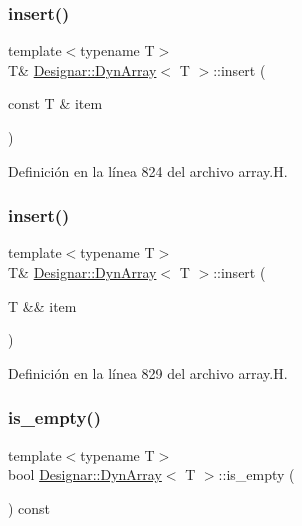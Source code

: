 \subsubsection{\texorpdfstring{insert()}{insert()}\hspace{0.1cm}{\footnotesize\ttfamily [3/4]}}
{\footnotesize\ttfamily template$<$typename T$>$ \\
T\& \hyperlink{class_designar_1_1_dyn_array}{Designar\+::\+Dyn\+Array}$<$ T $>$\+::insert (\begin{DoxyParamCaption}\item[{const T \&}]{item }\end{DoxyParamCaption})\hspace{0.3cm}{\ttfamily [inline]}}



Definición en la línea 824 del archivo array.\+H.

\mbox{\label{class_designar_1_1_dyn_array_a976a619d52dcc91d531e1b95609ec971}} 
\subsubsection{\texorpdfstring{insert()}{insert()}\hspace{0.1cm}{\footnotesize\ttfamily [4/4]}}
{\footnotesize\ttfamily template$<$typename T$>$ \\
T\& \hyperlink{class_designar_1_1_dyn_array}{Designar\+::\+Dyn\+Array}$<$ T $>$\+::insert (\begin{DoxyParamCaption}\item[{T \&\&}]{item }\end{DoxyParamCaption})\hspace{0.3cm}{\ttfamily [inline]}}



Definición en la línea 829 del archivo array.\+H.

\mbox{\label{class_designar_1_1_dyn_array_ae4692786599e9be77a9ca963b2fe7bf8}} 
\subsubsection{\texorpdfstring{is\+\_\+empty()}{is\_empty()}}
{\footnotesize\ttfamily template$<$typename T$>$ \\
bool \hyperlink{class_designar_1_1_dyn_array}{Designar\+::\+Dyn\+Array}$<$ T $>$\+::is\+\_\+empty (\begin{DoxyParamCaption}{ }\end{DoxyParamCaption}) const\hspace{0.3cm}{\ttfamily [inline]}}



